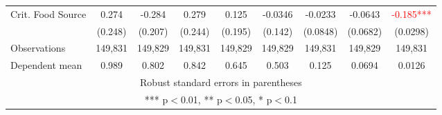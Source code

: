 \begin{tabular}{lcccccccc}
Crit. Food Source & 0.274 & -0.284 & 0.279 & 0.125 & -0.0346 & -0.0233 & -0.0643 & \textcolor{red}{-0.185***} \\
 & (0.248) & (0.207) & (0.244) & (0.195) & (0.142) & (0.0848) & (0.0682) & (0.0298) \\
Observations & 149,831 & 149,829 & 149,831 & 149,829 & 149,829 & 149,831 & 149,829 & 149,831 \\
Dependent mean & 0.989 & 0.802 & 0.842 & 0.645 & 0.503 & 0.125 & 0.0694 & 0.0126 \\ \hline
\multicolumn{9}{c}{ Robust standard errors in parentheses} \\
\multicolumn{9}{c}{ *** p$<$0.01, ** p$<$0.05, * p$<$0.1} \\
\end{tabular}
